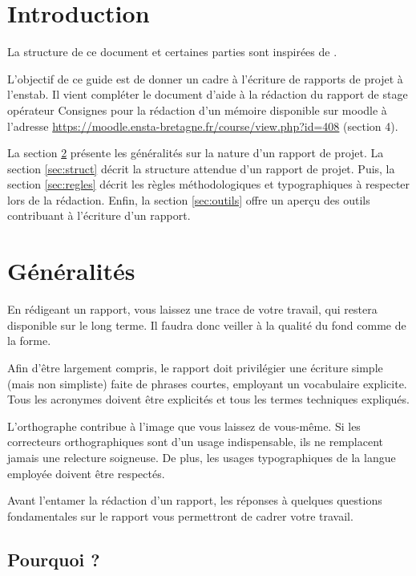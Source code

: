 \section{Introduction}

La structure de ce document et certaines parties sont inspirées de
\cite{guide}.

L'objectif de ce guide est de donner un cadre à l'écriture de rapports 
de projet
à l'\gls{enstab}.
Il vient compléter le document d'aide à la
rédaction du rapport de stage opérateur \og{}Consignes pour la rédaction d'un
mémoire\fg{} disponible sur moodle à l'adresse 
\url{https://moodle.ensta-bretagne.fr/course/view.php?id=408} (section 4). 


La section \ref{sec:gen} présente les généralités sur la nature d'un rapport
de projet. La section \ref{sec:struct} décrit la structure attendue d'un rapport de
projet.
Puis, la section \ref{sec:regles} décrit les règles méthodologiques et
typographiques à respecter lors de la rédaction.
Enfin, la section
\ref{sec:outils} offre un aperçu des outils contribuant à l'écriture d'un rapport.


\section{Généralités}
\label{sec:gen}

En rédigeant un rapport, vous laissez une trace de votre travail, qui restera
disponible sur le long terme. Il faudra donc veiller à la qualité du fond
comme de la forme.

Afin d'être largement compris, le rapport doit privilégier une
écriture simple (mais non simpliste) faite de phrases courtes,
employant un vocabulaire explicite. Tous les acronymes doivent être explicités
et tous les termes techniques expliqués.

L'orthographe contribue à l'image que vous laissez de vous-même. Si les
correcteurs orthographiques sont d'un usage indispensable, ils ne remplacent
jamais une relecture soigneuse.
De plus, les usages typographiques de la langue employée doivent être respectés.

Avant l'entamer la rédaction d'un rapport, les réponses à quelques questions
fondamentales sur le rapport vous permettront de cadrer votre travail.

\subsection*{Pourquoi ?}

